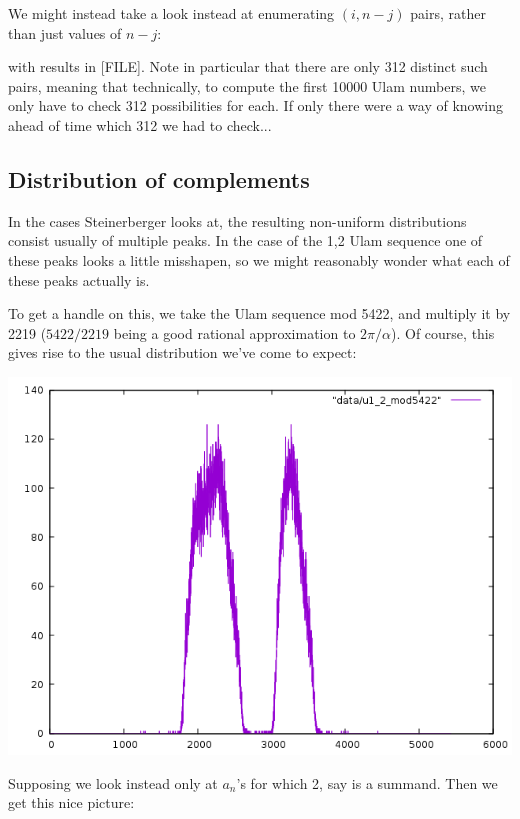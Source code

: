 \documentclass{article}
\theoremstyle{definition}
\theoremstyle{remark}
\numberwithin{equation}{section}
\begin{document}
{We might instead take a look instead at enumerating $(i,n-j)$ pairs,
rather than just values of $n-j$:


with results in [FILE].  Note in particular that there are
only 312 distinct such pairs, meaning that technically, to compute the
first 10000 Ulam numbers, we only have to check 312 possibilities for
each.  If only there were a way of knowing ahead of time which 312 we
had to check...


\subsection{Distribution of complements}


In the cases Steinerberger looks at, the resulting non-uniform
distributions consist usually of multiple peaks.  In the case of the
1,2 Ulam sequence one of these peaks looks a little misshapen, so we
might reasonably wonder what each of these peaks actually is.

To get a handle on this, we take the Ulam sequence mod 5422, and
multiply it by 2219 ($5422/2219$ being a good rational approximation
to $2\pi/\alpha$).  Of course, this gives rise to the usual
distribution we've come to expect:

\includegraphics[scale=0.5]{../figs/u1_2_mod5422.png}

Supposing we look instead only at $a_n$'s for which 2, say is a summand.  Then we get this nice picture:

}
\end{document}
